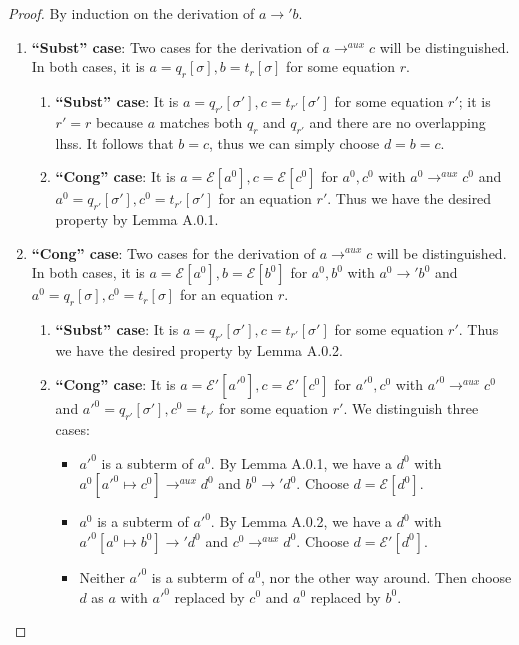\cdpaux*
\begin{proof}
By induction on the derivation of $a \longrightarrow' b$.

\begin{enumerate}
\item \textbf{``Subst'' case}: Two cases for the derivation of $a \longrightarrow^{aux} c$ will be distinguished. In both cases, it is $a = q_r[\sigma], b = t_r[\sigma]$ for some equation $r$.

\begin{enumerate}
\item \textbf{``Subst'' case}: It is $a = q_{r'}[\sigma'], c = t_{r'}[\sigma']$ for some equation $r'$; it is $r' = r$ because $a$ matches both $q_r$ and $q_{r'}$ and there are no overlapping lhss. It follows that $b = c$, thus we can simply choose $d = b = c$.

\item \textbf{``Cong'' case}: It is $a = \mathcal{E}[a^0], c = \mathcal{E}[c^0]$ for $a^0, c^0$ with $a^0 \longrightarrow^{aux} c^0$ and $a^0 = q_{r'}[\sigma'], c^0 = t_{r'}[\sigma']$ for an equation $r'$. Thus we have the desired property by Lemma A.0.1.
\end{enumerate}

\item \textbf{``Cong'' case}: Two cases for the derivation of $a \longrightarrow^{aux} c$ will be distinguished. In both cases, it is $a = \mathcal{E}[a^0], b = \mathcal{E}[b^0]$ for $a^0, b^0$ with $a^0 \longrightarrow' b^0$ and $a^0 = q_r[\sigma], c^0 = t_r[\sigma]$ for an equation $r$.

\begin{enumerate}
\item \textbf{``Subst'' case}: It is $a = q_{r'}[\sigma'], c = t_{r'}[\sigma']$ for some equation $r'$. Thus we have the desired property by Lemma A.0.2.

\item \textbf{``Cong'' case}: It is $a = \mathcal{E}'[a'^0], c = \mathcal{E}'[c^0]$ for $a'^0, c^0$ with $a'^0 \longrightarrow^{aux} c^0$ and $a'^0 = q_{r'}[\sigma'], c^0 = t_{r'}$ for some equation $r'$. We distinguish three cases:
\begin{itemize}
\item $a'^0$ is a subterm of $a^0$. By Lemma A.0.1, we have a $d^0$ with $a^0[a'^0 \mapsto c^0] \longrightarrow^{aux} d^0$ and $b^0 \longrightarrow' d^0$. Choose $d = \mathcal{E}[d^0]$.

\item $a^0$ is a subterm of $a'^0$. By Lemma A.0.2, we have a $d^0$ with $a'^0[a^0 \mapsto b^0] \longrightarrow' d^0$ and $c^0 \longrightarrow^{aux} d^0$. Choose $d = \mathcal{E}'[d^0]$.

\item Neither $a'^0$ is a subterm of $a^0$, nor the other way around. Then choose $d$ as $a$ with $a'^0$ replaced by $c^0$ and $a^0$ replaced by $b^0$.
\end{itemize}

\end{enumerate}
\end{enumerate}

\end{proof}

